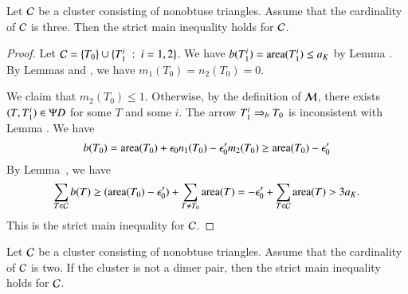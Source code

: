 \begin{lemma}
Let $\mathcal C$ be a cluster consisting of nonobtuse triangles.  Assume
that the cardinality of $\mathcal C$ is three. 
Then the strict main inequality holds for $\mathcal C$.
\end{lemma}

\begin{proof}  
Let $\mathcal C = \{T_0\}\cup \{T_1^i \ :\  i=1,2\}$.  
We have $b(T^i_1) = {\operatorname{area}}(T^i_1)\le a_K$ by Lemma .
By Lemmas  and , we have $m_1(T_0)=n_2(T_0)=0$.

We claim that $m_2(T_0)\le 1$.  Otherwise, by the definition of $\mathcal M$, there exists
$(T,T^i_1)\in\Psi D$ for some $T$ and some $i$.  The arrow $T^i_1\Rightarrow_{b} T_0$ is inconsistent
with Lemma .
We have
\[
b(T_0) = {\operatorname{area}}(T_0) + \epsilon_0 n_1(T_0) - \epsilon_0' m_2(T_0) \ge {\operatorname{area}}(T_0) - \epsilon_0'
\]
By Lemma~, we have
\[
\sum_{T\in\mathcal C} b(T) \ge ({\operatorname{area}}(T_0) - \epsilon_0') + \sum_{T\ne T_0} {\operatorname{area}}(T) = -\epsilon_0'+ \sum_{T\in\mathcal C} {\operatorname{area}}(T) > 3a_K.
\]
This is the strict main inequality for $\mathcal C$.
\end{proof}

\begin{lemma} Let $\mathcal C$ be a cluster consisting of nonobtuse triangles.  Assume
that the cardinality of $\mathcal C$ is two.  If the cluster is not a dimer pair, 
then the strict main inequality holds for $\mathcal C$.
\end{lemma}

